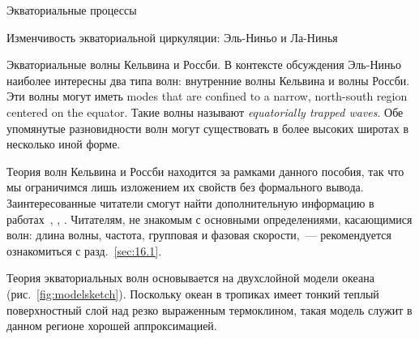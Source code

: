 \begin{chapter}{Экваториальные процессы}
\begin{section}{Изменчивость экваториальной циркуляции: Эль-Ниньо и Ла-Нинья}
\begin{paragraph}{Экваториальные волны Кельвина и Россби.}
В контексте обсуждения Эль-Ниньо наиболее интересны два типа волн:
внутренние волны Кельвина и волны 
Россби. Эти волны могут иметь modes that are confined 
to a narrow, north-south region centered on the equator. 
Такие волны называют 
\textit{equatorially trapped waves}. 
Обе упомянутые разновидности волн могут существовать в более высоких широтах
в несколько иной форме.
%

Теория волн Кельвина и Россби находится за рамками
данного пособия, так что мы ограничимся лишь изложением их свойств без
формального вывода. Заинтересованные читатели смогут найти дополнительную
информацию в работах~\cite[гл.~3]{Philander:1990}, \cite[гл.~3]{Pedlosky:1987}, 
\cite[\S6.10--6.12]{Apel:1987}. Читателям, не знакомым с основными определениями,
касающимися волн: длина волны, частота, групповая и фазовая скорости,~--- 
рекомендуется ознакомиться с разд.~\ref{sec:16.1}.
%

Теория экваториальных волн основывается на двухслойной модели океана
(рис.~\ref{fig:modelsketch}). Поскольку океан в тропиках имеет тонкий теплый
поверхностный слой над резко выраженным термоклином,
такая модель служит в данном регионе хорошей аппроксимацией.
%


\end{paragraph}
\end{section}
\end{chapter}
